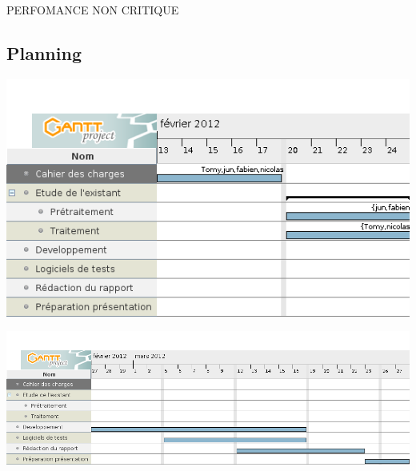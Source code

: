 PERFOMANCE NON CRITIQUE
\subsection{Planning}

\begin{center}
\includegraphics[width=\textwidth]{gantt1.png}
\end{center}
\begin{center}
\includegraphics[width=\textwidth]{gantt2.png}
\end{center}